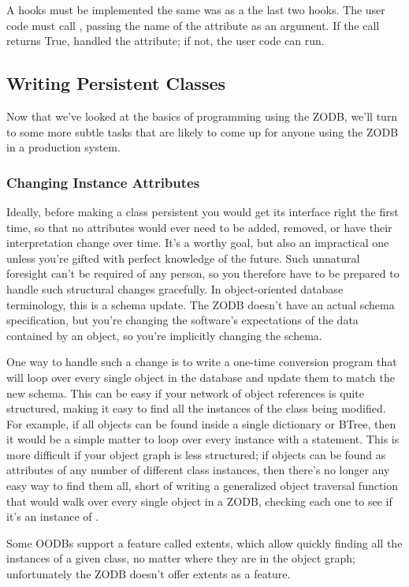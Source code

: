 A  hooks must be implemented the same was as a the
last two hooks.  The user code must call , passing
the name of the attribute as an argument.  If the call returns True,
 handled the attribute; if not, the user code can
run.

\subsection{Writing Persistent Classes}

Now that we've looked at the basics of programming using the ZODB,
we'll turn to some more subtle tasks that are likely to come up for
anyone using the ZODB in a production system.

\subsubsection{Changing Instance Attributes}

Ideally, before making a class persistent you would get its interface
right the first time, so that no attributes would ever need to be
added, removed, or have their interpretation change over time.  It's a
worthy goal, but also an impractical one unless you're gifted with
perfect knowledge of the future.  Such unnatural foresight can't be
required of any person, so you therefore have to be prepared to handle
such structural changes gracefully.  In object-oriented database
terminology, this is a schema update.  The ZODB doesn't have an actual
schema specification, but you're changing the software's expectations
of the data contained by an object, so you're implicitly changing the
schema.

One way to handle such a change is to write a one-time conversion
program that will loop over every single object in the database and
update them to match the new schema.  This can be easy if your network
of object references is quite structured, making it easy to find all
the instances of the class being modified.  For example, if all
 objects can be found inside a single dictionary or
BTree, then it would be a simple matter to loop over every
 instance with a  statement.
This is more difficult if your object graph is less structured; if
 objects can be found as attributes of any number of
different class instances, then there's no longer any easy way to find
them all, short of writing a generalized object traversal function
that would walk over every single object in a ZODB, checking each one
to see if it's an instance of .  

Some OODBs support a feature called extents, which allow quickly
finding all the instances of a given class, no matter where they are
in the object graph; unfortunately the ZODB doesn't offer extents as a
feature.


